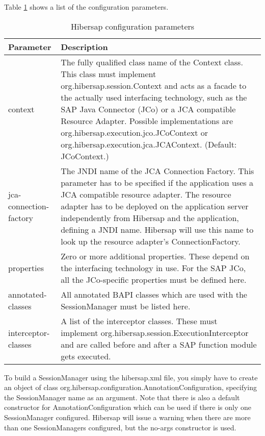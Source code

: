 Table \ref{tab:ConfigurationParameters} shows a list of the configuration parameters.

\begin{table}[H]
  \renewcommand{\arraystretch}{1.5}
  \centering
   \begin{tabularx}{\textwidth}{ l X }
    \toprule
    \textbf{Parameter}      & \textbf{Description} \\ 
    \midrule
    context                 &     
    The fully qualified class name of the Context class. This class must implement org.hibersap.session.Context and acts as a facade to
    the actually used interfacing technology, such as the SAP Java Connector (JCo) or a JCA compatible Resource Adapter. Possible 
    implementations are org.hibersap.execution.jco.JCoContext or org.hibersap.execution.jca.JCAContext. (Default: JCoContext.) 
    \\
    jca-connection-factory  & 
    The JNDI name of the JCA Connection Factory. This parameter has to be specified if the application uses a JCA compatible resource 
    adapter. The resource adapter has to be deployed on the application server independently from Hibersap and the application, defining 
    a JNDI name. Hibersap will use this name to look up the resource adapter's ConnectionFactory. 
    \\
    properties                   & 
    Zero or more additional properties. These depend on the interfacing technology in use. For the SAP JCo, all the JCo-specific 
    properties must be defined here. 
    \\
    annotated-classes        & 
    All annotated BAPI classes which are used with the SessionManager must be listed here. 
    \\
    interceptor-classes       & 
    A list of the interceptor classes. These must implement org.hibersap.session.ExecutionInterceptor and are called before and after a 
    SAP function module gets executed. \\ 
    \bottomrule
  \end{tabularx}
  \caption{Hibersap configuration parameters}
  \label{tab:ConfigurationParameters}
\end{table}

To build a SessionManager using the hibersap.xml file, you simply have to create an object of
class org.\-hibersap.\-configuration.\-AnnotationConfiguration, specifying the SessionManager name as an argument. Note 
that there is also a default constructor for AnnotationConfiguration which can be used if there 
is only one SessionManager configured. Hibersap will issue a warning when there are more than one SessionManagers 
configured, but the no-args constructor is used. 

